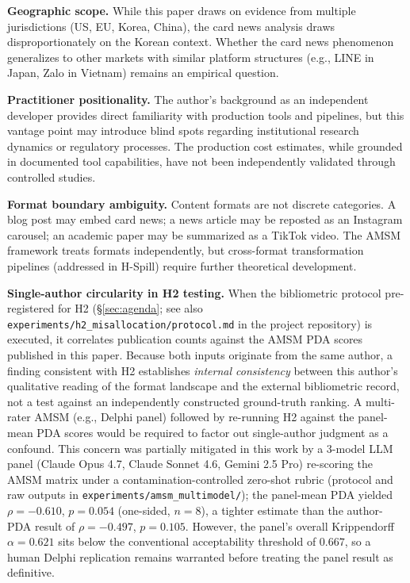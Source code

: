 \documentclass[12pt,a4paper]{article}
\begin{document}
\textbf{Geographic scope.} While this paper draws on evidence from multiple jurisdictions (US, EU, Korea, China), the card news analysis draws disproportionately on the Korean context. Whether the card news phenomenon generalizes to other markets with similar platform structures (e.g., LINE in Japan, Zalo in Vietnam) remains an empirical question.

\textbf{Practitioner positionality.} The author's background as an independent developer provides direct familiarity with production tools and pipelines, but this vantage point may introduce blind spots regarding institutional research dynamics or regulatory processes. The production cost estimates, while grounded in documented tool capabilities, have not been independently validated through controlled studies.

\textbf{Format boundary ambiguity.} Content formats are not discrete categories. A blog post may embed card news; a news article may be reposted as an Instagram carousel; an academic paper may be summarized as a TikTok video. The AMSM framework treats formats independently, but cross-format transformation pipelines (addressed in H-Spill) require further theoretical development.

\textbf{Single-author circularity in H2 testing.} When the bibliometric protocol pre-registered for H2 (\S\ref{sec:agenda}; see also \texttt{experiments/h2\_misallocation/protocol.md} in the project repository) is executed, it correlates publication counts against the AMSM PDA scores published in this paper. Because both inputs originate from the same author, a finding consistent with H2 establishes \emph{internal consistency} between this author's qualitative reading of the format landscape and the external bibliometric record, not a test against an independently constructed ground-truth ranking. A multi-rater AMSM (e.g., Delphi panel) followed by re-running H2 against the panel-mean PDA scores would be required to factor out single-author judgment as a confound. This concern was partially mitigated in this work by a 3-model LLM panel (Claude Opus 4.7, Claude Sonnet 4.6, Gemini 2.5 Pro) re-scoring the AMSM matrix under a contamination-controlled zero-shot rubric (protocol and raw outputs in \texttt{experiments/amsm\_multimodel/}); the panel-mean PDA yielded $\rho = -0.610$, $p = 0.054$ (one-sided, $n=8$), a tighter estimate than the author-PDA result of $\rho = -0.497$, $p = 0.105$. However, the panel's overall Krippendorff $\alpha = 0.621$ sits below the conventional acceptability threshold of $0.667$, so a human Delphi replication remains warranted before treating the panel result as definitive.
\end{document}
